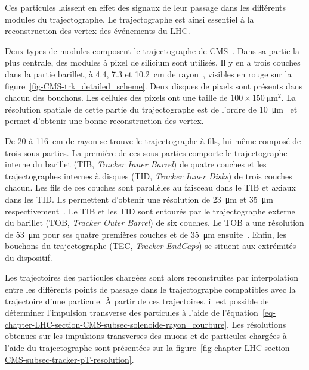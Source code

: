 Ces particules laissent en effet des signaux de leur passage dans les différents modules du trajectographe.
Le trajectographe est ainsi essentiel à la reconstruction des vertex des événements du LHC.
\par Deux types de modules composent le trajectographe de CMS~\cite{cms_paper,CERN-LHCC-98-006,CMS-TDR-11,CMS-TRK-11-001,CMS-TRK-17-001}.
Dans sa partie la plus centrale, des modules à pixel de silicium sont utilisés.
Il y en a trois couches dans la partie barillet, à \num{4.4}, \num{7.3} et \SI{10.2}{\centi\meter} de rayon~\cite{cms_paper}, visibles en rouge sur la figure~\ref{fig-CMS-trk_detailed_scheme}.
Deux disques de pixels sont présents dans chacun des bouchons.
Les cellules des pixels ont une taille de $\num{100}\times\SI{150}{\micro\meter^2}$.
La résolution spatiale de cette partie du trajectographe est de l'ordre de \SI{10}{\micro\meter}~\cite{cms_paper} et permet d'obtenir une bonne reconstruction des vertex.
\par De \num{20} à \SI{116}{\centi\meter} de rayon se trouve le trajectographe à fils, lui-même composé de trois sous-parties.
La première de ces sous-parties comporte le trajectographe interne du barillet (TIB, \emph{Tracker Inner Barrel}) de quatre couches et les trajectographes internes à disques (TID, \emph{Tracker Inner Disks}) de trois couches chacun.
Les fils de ces couches sont parallèles au faisceau dans le TIB et axiaux dans les TID.
Ils permettent d'obtenir une résolution de \SI{23}{\micro\meter} et \SI{35}{\micro\meter} respectivement~\cite{cms_paper}.
Le TIB et les TID sont entourés par le trajectographe externe du barillet (TOB, \emph{Tracker Outer Barrel}) de six couches.
Le TOB a une résolution de \SI{53}{\micro\meter} pour ses quatre premières couches et de \SI{35}{\micro\meter} ensuite~\cite{cms_paper}.
Enfin, les bouchons du trajectographe (TEC, \emph{Tracker EndCaps}) se situent aux extrémités du dispositif.
\par Les trajectoires des particules chargées sont alors reconstruites par interpolation entre les différents points de passage dans le trajectographe compatibles avec la trajectoire d'une particule.
À partir de ces trajectoires, il est possible de déterminer l'impulsion transverse des particules à l'aide de l'équation~\eqref{eq-chapter-LHC-section-CMS-subsec-solenoide-rayon_courbure}.
Les résolutions obtenues sur les impulsions transverses des muons et de particules chargées à l'aide du trajectographe sont présentées sur la figure~\ref{fig-chapter-LHC-section-CMS-subsec-tracker-pT-resolution}.